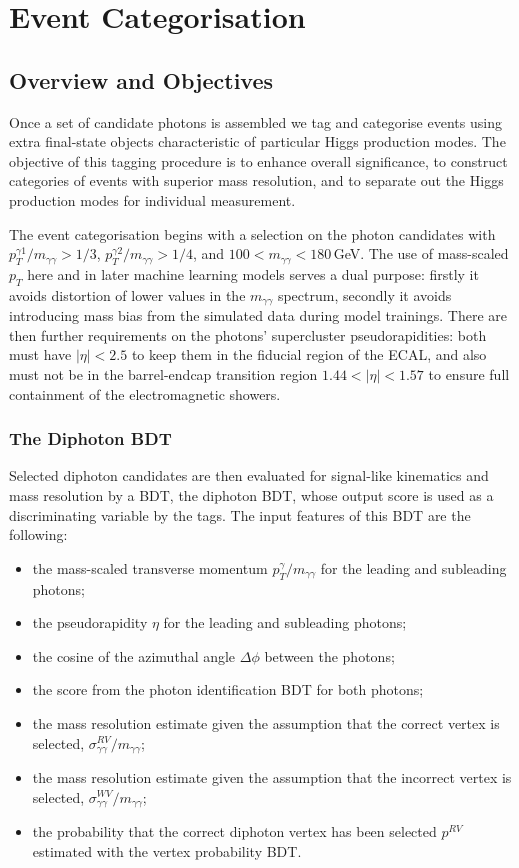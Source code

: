 \chapter{Event Categorisation}
\label{chap:event_select}

\section{Overview and Objectives}
Once a set of candidate photons is assembled we tag and categorise events using extra final-state objects characteristic of particular Higgs production modes.
The objective of this tagging procedure is to enhance overall significance, to construct categories of events with superior mass resolution, and to separate out the Higgs production modes for individual measurement. 


The event categorisation begins with a selection on the photon candidates with $p_{T}^{\gamma1}/m_{\gamma\gamma} > 1/3$, $p_{T}^{\gamma2}/m_{\gamma\gamma} > 1/4$, and $100 < m_{\gamma\gamma} < 180$\,GeV.
The use of mass-scaled $p_{T}$ here and in later machine learning models serves a dual purpose: firstly it avoids distortion of lower values in the $m_{\gamma\gamma}$ spectrum, secondly it avoids introducing mass bias from the simulated data during model trainings. 
There are then further requirements on the photons' supercluster pseudorapidities: both must have $|\eta| < 2.5$ to keep them in the fiducial region of the ECAL, and also must not be in the barrel-endcap transition region $1.44 < |\eta| < 1.57$ to ensure full containment of the electromagnetic showers. 


\subsection{The Diphoton BDT}
Selected diphoton candidates are then evaluated for signal-like kinematics and mass resolution by a BDT, the diphoton BDT, whose output score is used as a discriminating variable by the tags.
The input features of this BDT are the following:
\begin{itemize}[noitemsep]
    \item the mass-scaled transverse momentum $p^{\gamma}_{T}/m_{\gamma\gamma}$ for the leading and subleading photons;
    \item the pseudorapidity $\eta$ for the leading and subleading photons;
    \item the cosine of the azimuthal angle $\Delta\phi$ between the photons;
    \item the score from the photon identification BDT for both photons;
    \item the mass resolution estimate given the assumption that the correct vertex is selected, $\sigma^{RV}_{\gamma\gamma}/m_{\gamma\gamma}$;
    \item the mass resolution estimate given the assumption that the incorrect vertex is selected, $\sigma^{WV}_{\gamma\gamma}/m_{\gamma\gamma}$;
    \item the probability that the correct diphoton vertex has been selected $p^{RV}$ estimated with the vertex probability BDT.
\end{itemize}

